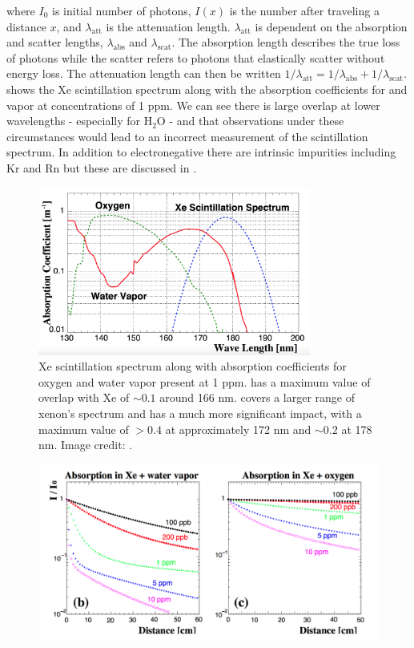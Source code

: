 where $I_0$ is initial number of photons, $I(x)$ is the number after traveling a distance $x$, and $\lambda_{\mathrm{att}}$ is the
attenuation length.  $\lambda_{\mathrm{att}}$ is dependent on the absorption and scatter lengths, $\lambda_{\mathrm{abs}}$ and
$\lambda_{\mathrm{scat}}$.  The absorption length describes the true loss of photons while the scatter refers to photons that elastically
scatter without energy loss.  The attenuation length can then be written
$1 / \lambda_{\mathrm{att}} = 1 / \lambda_{\mathrm{abs}} + 1 / \lambda_{\mathrm{scat}}$.   shows
the Xe scintillation spectrum along with the absorption coefficients for \otwo and \htwoo vapor at concentrations of 1 ppm.  We can see
there is large overlap at lower wavelengths - especially for H$_2$O - and that observations under these circumstances would lead to an
incorrect measurement of the scintillation spectrum.  In addition to electronegative there are intrinsic
impurities including Kr and Rn but these are discussed in .

\begin{figure}
\centering
\includegraphics[width=0.8\textwidth]{AbsorptionSpectra}
\caption{Xe scintillation spectrum along with absorption coefficients for oxygen and water vapor present at 1 ppm.  \otwo has a maximum
value of overlap
with Xe of ${\sim} 0.1$ around 166 nm.  \htwoo covers a larger range of xenon's spectrum and has a much more significant impact, with a
maximum value of $> 0.4$ at approximately 172 nm and ${\sim} 0.2$ at 178 nm.  Image credit: .}
\label{fig:xenon1t_pur_absorption_spectra}
\end{figure}

\begin{figure}
\centering
\includegraphics[width=\textwidth]{AbsorptionWithDistance}
\label{fig:xenon1t_pur_absorp_dist}
\end{figure}

